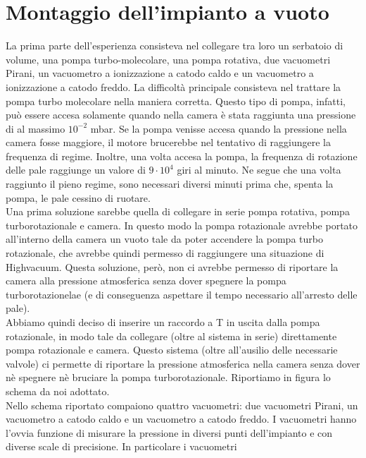 \documentclass[11pt]{article}
\begin{document}
\section{Montaggio dell'impianto a vuoto}
La prima parte dell'esperienza consisteva nel collegare tra loro un serbatoio di volume, una pompa turbo-molecolare, una pompa rotativa, due vacuometri Pirani, un vacuometro a ionizzazione a catodo caldo e un vacuometro a ionizzazione a catodo freddo. La difficoltà principale consisteva nel trattare la pompa turbo molecolare nella maniera corretta. Questo tipo di pompa, infatti, può essere accesa solamente quando nella camera è stata raggiunta una pressione di al massimo $10^{-2}$ mbar. Se la pompa venisse accesa quando la pressione nella camera fosse maggiore, il motore brucerebbe nel tentativo di raggiungere la frequenza di regime. Inoltre, una volta accesa la pompa, la frequenza di rotazione delle pale raggiunge un valore di $9\cdot10^{4}$ giri al minuto. Ne segue che una volta raggiunto il pieno regime, sono necessari diversi minuti prima che, spenta la pompa, le pale cessino di ruotare. 
\\
 \hspace*{5mm}Una prima soluzione sarebbe quella di collegare in serie pompa rotativa, pompa turborotazionale e camera. In questo modo la pompa rotazionale avrebbe portato all'interno della camera un vuoto tale da poter accendere la pompa turbo rotazionale, che avrebbe quindi permesso di raggiungere una situazione di Highvacuum. Questa soluzione, però, non ci avrebbe permesso di riportare la camera alla pressione atmosferica senza dover spegnere la pompa turborotazionelae (e di conseguenza aspettare il tempo necessario all'arresto delle pale).
 \\ 
 \hspace*{5mm}Abbiamo quindi deciso di inserire un raccordo a T in uscita dalla pompa rotazionale, in modo tale da collegare (oltre al sistema in serie) direttamente pompa rotazionale e camera. Questo sistema (oltre all'ausilio delle necessarie valvole) ci permette di riportare la pressione atmosferica nella camera senza dover nè spegnere nè bruciare la pompa turborotazionale. Riportiamo in figura lo schema da noi adottato. 
  \\
  \hspace*{5mm}Nello schema riportato compaiono quattro vacuometri: due vacuometri Pirani, un vacuometro a catodo caldo e un vacuometro a catodo freddo. I vacuometri hanno l'ovvia funzione di misurare la pressione in diversi punti dell'impianto e con diverse scale di precisione. In particolare i vacuometri
\end{document}
